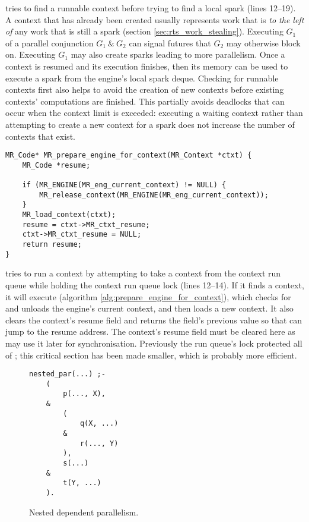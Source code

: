 \idle tries to find a runnable context before trying to find a local
spark (lines 12--19).
A context that has already been created usually represents work that is
\emph{to the left of}
any work that is still a spark (section \ref{sec:rts_work_stealing}).
Executing $G_1$ of a parallel conjunction $G_1~\&~G_2$ can signal futures
that $G_2$ may otherwise block on.
Executing $G_1$ may also create sparks leading to more parallelism.
Once a context is resumed and its execution finishes,
then its memory can be used to execute a spark from the engine's local spark
deque.
Checking for runnable contexts first also helps to avoid the creation of new
contexts before existing contexts' computations are finished.
This partially avoids deadlocks that can occur when the context limit is
exceeded:
executing a waiting context rather than attempting to create a new context
for a spark does not increase the number of contexts that exist.

\begin{algorithm}
\begin{verbatim}
MR_Code* MR_prepare_engine_for_context(MR_Context *ctxt) {
    MR_Code *resume;

    if (MR_ENGINE(MR_eng_current_context) != NULL) {
        MR_release_context(MR_ENGINE(MR_eng_current_context));
    }
    MR_load_context(ctxt);
    resume = ctxt->MR_ctxt_resume;
    ctxt->MR_ctxt_resume = NULL;
    return resume;
}
\end{verbatim}
\caption{\prepareengineforcontext}
\label{alg:prepare_engine_for_context}
\end{algorithm}

\idle tries to run a context by attempting to take a context from the
context run queue while holding the context run queue lock (lines 12--14).
If it finds a context,
it will execute \prepareengineforcontext (algorithm
\ref{alg:prepare_engine_for_context}),
which checks for and unloads the engine's current context,
and then loads a new context.
It also clears the context's resume field and returns the field's previous
value so that \idle can jump to the resume address.
The context's resume field must be cleared here as
\joinandcontinue may use it later for synchronisation.
Previously the run queue's lock protected all of \idle;
this critical section has been made smaller,
which is probably more efficient.

\begin{figure}
\begin{center}
\begin{verbatim}
nested_par(...) ;-
    (
        p(..., X),
    &
        (
            q(X, ...)
        & 
            r(..., Y)
        ),
        s(...)
    &
        t(Y, ...)
    ).
\end{verbatim}
\end{center}
\caption{Nested dependent parallelism.}
\label{fig:nested_dep_par}
\end{figure}

